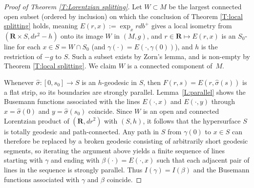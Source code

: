 \documentclass[12pt]{amsart}
\newcommand{\R}{{\mathbf R}}
\begin{document}
\begin{proof}[Proof of Theorem \ref{T:Lorentzian splitting}]
Let $W \subset M$ be the largest connected open subset (ordered by inclusion) on which the conclusion of Theorem \ref{T:local splitting} holds,
meaning $E(r,x) := \exp_x r db^+$ gives a local isometry from $(\R \times S, dr^2 -h)$ onto its image $W$ in $(M,g)$,  
and $r \in \R \mapsto E(r,x)$ is an $S_0$-line for each $x \in S=W \cap S_0$ (and $\gamma(\cdot)=E(\cdot,\gamma(0))$), and $h$ is the restriction of $-g$ to $S$.  
Such a subset exists by Zorn's lemma,  and is non-empty by Theorem \ref{T:local splitting}.
We claim $W$ is a connected component of~$M$.

Whenever $\hat \sigma:[0,s_0] \longrightarrow S$ is an $h$-geodesic in $S$,  then $F(r,s) = E(r,\hat \sigma(s))$ is a flat strip, so its boundaries are strongly parallel.  Lemma~\ref{L:parallel} shows the Busemann functions associated with the lines $E(\cdot,x)$ and $E(\cdot,y)$ through $x=\hat\sigma(0)$
and $y =\hat \sigma(s_0)$ coincide.  
Since $W$ is an open and connected Lorentzian product of $(\R,dr^2)$ with $(S,h)$,
it follows that the hypersurface $S$ is totally geodesic and path-connected.  
Any path in $S$ from $\gamma(0)$ to $x \in S$ can therefore be replaced by a broken geodesic consisting of arbitrarily short geodesic segments, so iterating the argument above yields a finite sequence of lines starting with $\gamma$ and ending with $\beta(\cdot) = E(\cdot, x)$ such that each adjacent pair of lines in the sequence is strongly parallel.  Thus $I(\gamma) = I(\beta)$ and the Busemann functions associated with $\gamma$ and $\beta$
 coincide.


\end{proof}
\end{document}
